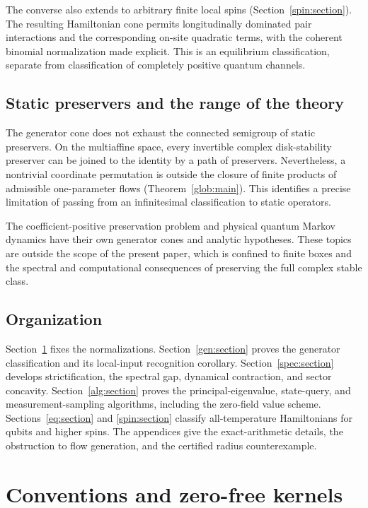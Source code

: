 \documentclass[reqno]{amsart}
\theoremstyle{definition}
\theoremstyle{remark}
\begin{document}
The converse also extends to arbitrary finite local spins
(Section~\ref{spin:section}). The resulting Hamiltonian cone permits
longitudinally dominated pair interactions and the corresponding
on-site quadratic terms, with the coherent binomial normalization
made explicit. This is an equilibrium classification, separate from
classification of completely positive quantum channels.

\subsection{Static preservers and the range of the theory}

The generator cone does not exhaust the connected semigroup of static
preservers. On the multiaffine space, every invertible complex
 disk-stability preserver can be joined to the identity by a path of
preservers. Nevertheless, a nontrivial coordinate permutation is
outside the closure of finite products of admissible one-parameter
flows (Theorem~\ref{glob:main}). This identifies a precise limitation
of passing from an infinitesimal classification to static operators.

The coefficient-positive preservation problem and physical quantum
Markov dynamics have their own generator cones and analytic hypotheses.
These topics are outside the scope of the present paper, which is confined to
finite boxes and the spectral and computational consequences of
preserving the full complex stable class.

\subsection{Organization}
Section~\ref{pre:section} fixes the normalizations.
Section~\ref{gen:section} proves the generator classification and its
local-input recognition corollary. Section~\ref{spec:section} develops
strictification, the spectral gap, dynamical contraction, and sector
concavity. Section~\ref{alg:section} proves the principal-eigenvalue,
state-query, and measurement-sampling algorithms, including the
zero-field value scheme. Sections~\ref{eq:section} and
\ref{spin:section} classify all-temperature Hamiltonians for qubits
and higher spins. The appendices give the exact-arithmetic details,
the obstruction to flow generation, and the certified radius
counterexample.
\par


\section{Conventions and zero-free kernels}\label{pre:section}
\end{document}
